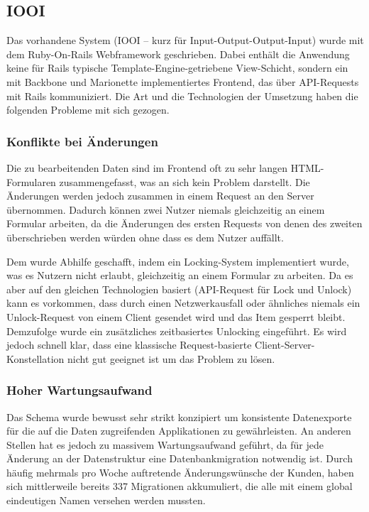 \subsection{IOOI}
\label{ssec:ep_iooi}

Das vorhandene System (IOOI -- kurz für Input-Output-Output-Input) wurde mit
dem Ruby-On-Rails Webframework geschrieben.  Dabei enthält die Anwendung keine
für Rails typische Template-Engine-getriebene View-Schicht, sondern ein mit
Backbone und Marionette \cite{marionette} implementiertes Frontend, das über
API-Requests mit Rails kommuniziert.  Die Art und die Technologien der Umsetzung
haben die folgenden Probleme mit sich gezogen.

\subsubsection{Konflikte bei Änderungen}
\label{sssec:epv_konflikte_bei_aenderungen}

Die zu bearbeitenden Daten sind im Frontend oft zu sehr langen HTML-Formularen
zusammengefasst, was an sich kein Problem darstellt.  Die Änderungen werden
jedoch zusammen in einem Request an den Server übernommen.  Dadurch können zwei
Nutzer niemals gleichzeitig an einem Formular arbeiten, da die Änderungen des
ersten Requests von denen des zweiten überschrieben werden würden ohne dass es
dem Nutzer auffällt.

Dem wurde Abhilfe geschafft, indem ein Locking-System implementiert wurde, was
es Nutzern nicht erlaubt, gleichzeitig an einem Formular zu arbeiten.  Da es
aber auf den gleichen Technologien basiert (API-Request für Lock und Unlock)
kann es vorkommen, dass durch einen Netzwerkausfall oder ähnliches niemals ein
Unlock-Request von einem Client gesendet wird und das Item gesperrt bleibt.
Demzufolge wurde ein zusätzliches zeitbasiertes Unlocking eingeführt.  Es wird
jedoch schnell klar, dass eine klassische Request-basierte
Client-Server-Konstellation nicht gut geeignet ist um das Problem zu lösen.

\subsubsection{Hoher Wartungsaufwand}
\label{sssec:epv_hoher_wartungsaufwand}

Das Schema wurde bewusst sehr strikt konzipiert um konsistente Datenexporte für
die auf die Daten zugreifenden Applikationen zu gewährleisten.  An anderen
Stellen hat es jedoch zu massivem Wartungsaufwand geführt, da für jede Änderung
an der Datenstruktur eine Datenbankmigration notwendig ist.  Durch häufig
mehrmals pro Woche auftretende Änderungswünsche der Kunden, haben sich
mittlerweile bereits 337 Migrationen akkumuliert, die alle mit einem global
eindeutigen Namen versehen werden mussten.

